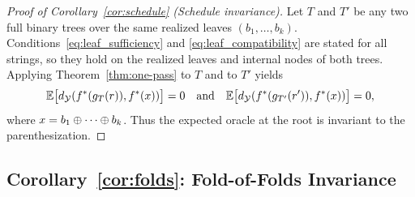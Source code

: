 \begin{proof}[Proof of Corollary~\ref{cor:schedule} (Schedule invariance)]
\label{proof:cor-schedule}
Let $T$ and $T'$ be any two full binary trees over the same realized leaves $(b_1,\ldots,b_k)$. Conditions~\eqref{eq:leaf_sufficiency} and \eqref{eq:leaf_compatibility} are stated for all strings, so they hold on the realized leaves and internal nodes of both trees. Applying Theorem~\ref{thm:one-pass} to $T$ and to $T'$ yields
\[
\mathbb{E}\big[d_{\mathcal{Y}}(f^{\ast}(g_T(r)),f^{\ast}(x))\big]=0
\quad\text{and}\quad
\mathbb{E}\big[d_{\mathcal{Y}}(f^{\ast}(g_{T'}(r')),f^{\ast}(x))\big]=0,
\]
where $x=b_1\oplus\cdots\oplus b_k$. Thus the expected oracle at the root is invariant to the parenthesization.
\end{proof}


\subsection{Corollary~\ref{cor:folds}: Fold-of-Folds Invariance}

